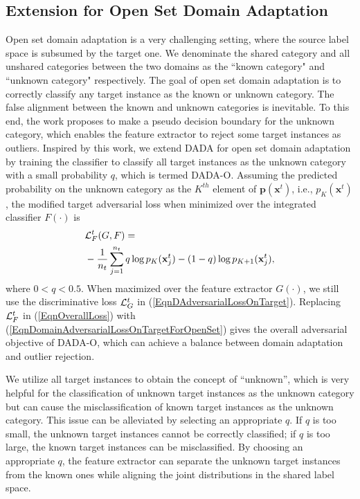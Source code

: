 \documentclass[letterpaper]{article} \usepackage{aaai20}  \usepackage{times}  \usepackage{helvet} \usepackage{courier}  \usepackage[hyphens]{url}  \usepackage{graphicx} \urlstyle{rm} \def\UrlFont{\rm}  \usepackage{graphicx}  \frenchspacing  \setlength{\pdfpagewidth}{8.5in}  \setlength{\pdfpageheight}{11in}
\begin{document}
\subsection{Extension for Open Set Domain Adaptation}
Open set domain adaptation is a very challenging setting, where the source label space is subsumed by the target one. We denominate the shared category and all unshared categories between the two domains as the ``known category" and ``unknown category" respectively. The goal of open set domain adaptation is to correctly classify any target instance as the known or unknown category. The false alignment between the known and unknown categories is inevitable. To this end, the work \cite{bp_for_os} proposes to make a pseudo decision boundary for the unknown category, which enables the feature extractor to reject some target instances as outliers. Inspired by this work, we extend DADA for open set domain adaptation by training the classifier to classify all target instances as the unknown category with a small probability $q$, which is termed DADA-O. Assuming the predicted probability on the unknown category as the $K^{th}$ element of $\mathbf{p}(\mathbf{x}^t)$, i.e., $p_K(\mathbf{x}^t)$, the modified target adversarial loss when minimized over the integrated classifier $F(\cdot)$ is 
\begin{eqnarray}\label{EqnDomainAdversarialLossOnTargetForOpenSet}
\begin{aligned}
&{\cal{L}}^t_{F} (G, F) = \\ & - \frac{1}{n_t} \sum_{j=1}^{n_t} q \log p_K(\mathbf{x}_j^t) - (1 - q) \log p_{K+1}(\mathbf{x}_j^t), 
\end{aligned}
\end{eqnarray}
where $0 < q < 0.5$. When maximized over the feature extractor $G(\cdot)$, we still use the discriminative loss ${\cal{L}}_G^t$ in (\ref{EqnDAdversarialLossOnTarget}). Replacing ${\cal{L}}_F^t$ in (\ref{EqnOverallLoss}) with (\ref{EqnDomainAdversarialLossOnTargetForOpenSet}) gives the overall adversarial objective of DADA-O, which can achieve a balance between domain adaptation and outlier rejection.

We utilize all target instances to obtain the concept of ``unknown'', which is very helpful for the classification of unknown target instances as the unknown category but can cause the misclassification of known target instances as the unknown category. This issue can be alleviated by selecting an appropriate $q$. If $q$ is too small, the unknown target instances cannot be correctly classified; if $q$ is too large, the known target instances can be misclassified. By choosing an appropriate $q$, the feature extractor can separate the unknown target instances from the known ones while aligning the joint distributions in the shared label space.
\end{document}
